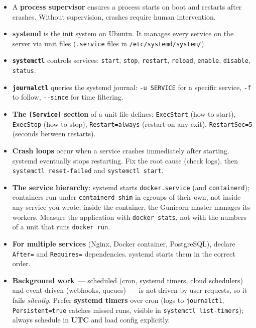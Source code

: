 \label{25-process-management:key-takeaways}
\begin{takeaways}

\begin{itemize}
\tightlist
\item
  A \textbf{process supervisor} ensures a process starts on boot and restarts after crashes. Without supervision, crashes require human intervention.
\item
  \textbf{systemd} is the init system on Ubuntu. It manages every service on the server via unit files (\texttt{.service} files in \texttt{/}\allowbreak{}\texttt{etc/}\allowbreak{}\texttt{systemd/}\allowbreak{}\texttt{system/}).
\item
  \textbf{\texttt{systemctl}} controls services: \texttt{start}, \texttt{stop}, \texttt{restart}, \texttt{reload}, \texttt{enable}, \texttt{disable}, \texttt{status}.
\item
  \textbf{\texttt{journalctl}} queries the systemd journal: \texttt{-u\ SERVICE} for a specific service, \texttt{-f} to follow, \texttt{-\/-since} for time filtering.
\item
  \textbf{The \texttt{{[}Service{]}} section} of a unit file defines: \texttt{ExecStart} (how to start), \texttt{ExecStop} (how to stop), \texttt{Restart=always} (restart on any exit), \texttt{RestartSec=5} (seconds between restarts).
\item
  \textbf{Crash loops} occur when a service crashes immediately after starting. systemd eventually stops restarting. Fix the root cause (check logs), then \texttt{systemctl\ reset-failed} and \texttt{systemctl\ start}.
\item
  \textbf{The service hierarchy}: systemd starts \texttt{docker.service} (and \texttt{containerd}); containers run under \texttt{containerd-shim} in cgroups of their own, not inside any service you wrote; inside the container, the Gunicorn master manages its workers. Measure the application with \texttt{docker\ stats}, not with the numbers of a unit that runs \texttt{docker\ run}.
\item
  \textbf{For multiple services} (Nginx, Docker container, PostgreSQL), declare \texttt{After=} and \texttt{Requires=} dependencies. systemd starts them in the correct order.
\item
  \textbf{Background work}~--- scheduled (cron, systemd timers, cloud schedulers) and event-driven (webhooks, queues)~--- is not driven by user requests, so it fails \emph{silently}. Prefer \textbf{systemd timers} over cron (logs to \texttt{journalctl}, \texttt{Persistent=true} catches missed runs, visible in \texttt{systemctl\ list-timers}); always schedule in \textbf{UTC} and load config explicitly.

\end{itemize}
\end{takeaways}
